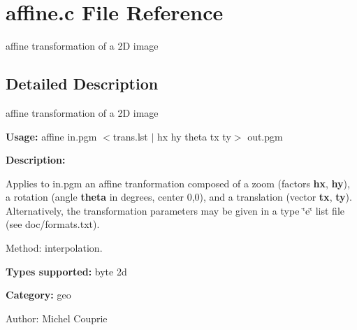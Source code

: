 \section{affine.c File Reference}
\label{affine_8c}
affine transformation of a 2D image 



\subsection{Detailed Description}
affine transformation of a 2D image 

{\bf Usage:} affine in.pgm $<$trans.lst $|$ hx hy theta tx ty$>$ out.pgm

{\bf Description:}

Applies to in.pgm an affine tranformation composed of a zoom (factors {\bf hx}, {\bf hy}), a rotation (angle {\bf theta} in degrees, center 0,0), and a translation (vector {\bf tx}, {\bf ty}). Alternatively, the transformation parameters may be given in a type \char`\"{}e\char`\"{} list file (see doc/formats.txt).

Method: interpolation.

{\bf Types supported:} byte 2d

{\bf Category:} geo

\begin{Desc}
\item[Author:]Michel Couprie \end{Desc}
